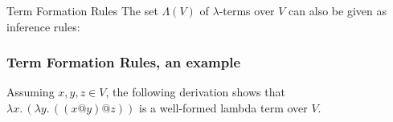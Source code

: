 \begin{frame}{Term Formation Rules}
  The set $\Lambda(V)$ of $\lambda$-terms over $V$ can also be given as inference rules:
    \begin{prooftree}
    \end{prooftree}
    \qquad
    \begin{prooftree}
    \end{prooftree}
    \qquad
    \begin{prooftree}
    \end{prooftree}
\end{frame}

\begin{frame}[t]
  \frametitle{Term Formation Rules, an example}
   Assuming $x,y,z \in V$, the following derivation shows that $\lambda
   x.\,(\lambda y.\,((x @ y) @ z))$ is a well-formed lambda term over $V$.

  \begin{prooftree}






\end{prooftree}
  
\end{frame}

